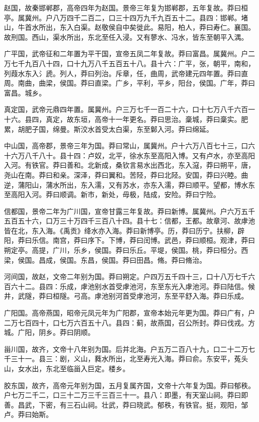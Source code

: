 \documentclass[]{article}
\begin{document}
赵国，故秦邯郸郡，高帝四年为赵国。景帝三年复为邯郸郡，五年复故。莽曰桓亭。属冀州。户八万四千二百二，口三十四万九千九百五十二。县四：邯郸。堵山，牛首水所出，东入白渠。赵敬侯自中矣徙此。易阳，柏人，莽曰寿仁。襄国。故刑国。西山，渠水所出，东北至任入浸。又有蓼水、冯水，皆东至朝平入湡。

广平国，武帝征和二年置为平干国，宣帝五凤二年复故。莽曰富昌。属冀州。户二万七千九百八十四，口十九万八千五百五十八。县十六：广平，张，朝平，南和，列葭水东入氵虒。列人，莽曰列治。斥章，任，曲周，武帝建元四年置。莽曰直周。南曲，曲梁，侯国。莽曰直梁。广乡，平利，平乡，阳台，侯国。广年，莽曰富昌。城乡。

真定国，武帝元鼎四年置。属冀州。户三万七千一百二十六，口十七万八千六百一十六。县四，真定，故东垣，高帝十一年更名。莽曰思治。稾城，莽曰稾实。肥累，胡肥子国，绵曼。斯洨水首受太白渠，东至鄡入河。莽曰绵延。

中山国，高帝郡，景帝三年为国。莽曰常山，属冀州。户十六万八百七十三，口六十六万八千八十。县十四：卢奴，北平，徐水东至高阳入博。又有卢水，亦至高阳入河。有铁官。莽曰善和。北新成，桑钦言易水出西北，东入滱，莽曰朔平，唐，尧山在南。莽曰和亲。深泽，莽曰翼和。苦陉，莽曰北陉。安国，莽曰兴睦。曲逆，蒲阳山，蒲水所出，东入濡，又有苏水，亦东入濡，莽曰顺平。望都，博水东至高阳入河。莽曰顺调。新市，新处，毋极，陆成，安险。莽曰宁险。

信都国，景帝二年为广川国，宣帝甘露三年复故。莽曰新博。属冀州。户六万五千五百五十六，口万三十万四千三百八十四。县十七：信都，王都。故章河、故虖池皆在北，东入海。《禹贡》绛水亦入海。莽曰新博亭。历，莽曰历宁。扶柳，辟阳，莽曰乐信。南宫，莽曰序下。下博，莽曰闰博。武邑，莽曰顺桓。观津，莽曰朔定亭。高提，广川，乐乡，侯国。莽曰乐丘。平堤，侯国。桃，莽曰桓分。西梁，侯国。昌成，侯国。东昌，侯国。莽曰田昌。脩。莽曰脩治。

河间国，故赵，文帝二年别为国。莽曰朔定。户四万五千四十三，口十八万七千六百六十二。县四：乐成，虖池别水首受虖池河，东至东光入虖池河。莽曰陆信。候井，武隧，莽曰桓隧。弓高。虖池别河首受虖池河，东至平舒入海。莽曰乐成。

广阳国。高帝燕国，昭帝元凤元年为广阳郡，宣帝本始元年更为国。莽曰广有，户二万七百四十，口七万六百五十八。县四：蓟，故燕国，召公所封。莽曰伐戎。方城。广阳，阴乡。莽曰阴顺。

甾川国，故齐，文帝十八年别为国。后并北海。户五万二百八十九，口二十二万七千三十一。县三：剧，义山，蕤水所出，北至寿光入海。莽曰俞。东安平，菟头山，女水出，东北至临甾入巨定。楼乡。

胶东国，故齐，高帝元年别为国，五月复属齐国，文帝十六年复为国。莽曰郁秩。户七万二千二，口三十二万三千三百三十一。县八：即墨，有天室山祠。莽曰即善。昌武，下密，有三石山祠。壮武，莽曰晓武。郁秩，有铁官。挺，观阳，邹卢。莽曰始斯。
\end{document}
